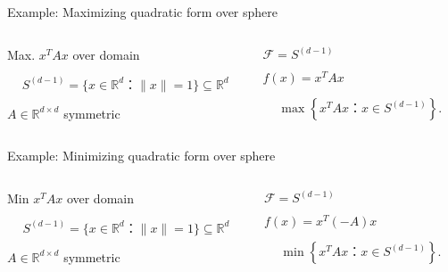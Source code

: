 \begin{frame}{Example: Maximizing quadratic form over sphere}

    \begin{columns}[t]
      \begin{column}{.5\textwidth}
        Max. $ x^T A x$ over domain

        
        $$S^{(d-1)} = \{ x ∈ ℝ^d ： \|x\| = 1 \} ⊆ ℝ^d$$

        \bigskip 
       $A ∈ ℝ^{d×d}$  symmetric
        
      \end{column}
      \begin{column}{.5\textwidth}
        $ℱ = S^{(d-1)}$

        \medskip 
        $f(x) = x^T A x$

        \bigskip 
  \begin{displaymath}
    \max\left\{ x^T A x ： x ∈S^{(d-1)} \right\}. 
  \end{displaymath}
      \end{column}       
    \end{columns}
  \end{frame}


\begin{frame}{Example: Minimizing quadratic form over sphere}

    \begin{columns}[t]
      \begin{column}{.5\textwidth}
        Min $ x^T A x$ over domain

        
        $$S^{(d-1)} = \{ x ∈ ℝ^d ： \|x\| = 1 \} ⊆ ℝ^d$$

        \bigskip 
       $A ∈ ℝ^{d×d}$  symmetric
        
      \end{column}
      \begin{column}{.5\textwidth}
        $ℱ = S^{(d-1)}$

        \medskip 
        $f(x) = x^T (-A) x$

        \bigskip 
  \begin{displaymath}
    \min\left\{ x^T A x ： x ∈S^{(d-1)} \right\}. 
  \end{displaymath}
      \end{column}       
    \end{columns}
  \end{frame}



  

